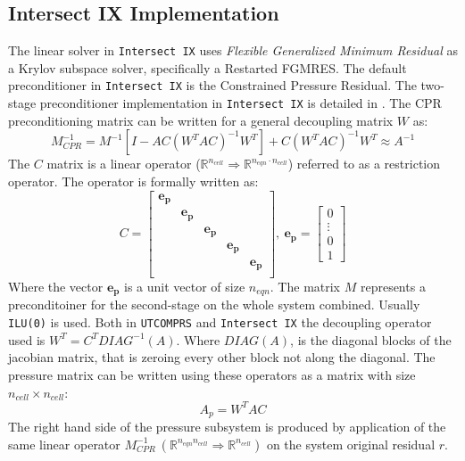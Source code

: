 \subsection{Intersect IX Implementation}
The linear solver in \texttt{Intersect IX} uses \textit{Flexible Generalized Minimum Residual} as a Krylov subspace solver, specifically a Restarted FGMRES.  
The default preconditioner in \texttt{Intersect IX} is the Constrained Pressure Residual. The two-stage preconditioner implementation in \texttt{Intersect IX}
is detailed in \cite{ix-cpr,ix-tech}. The CPR preconditioning matrix can be written for a general decoupling matrix $W$ as:
\begin{equation}
	M_{CPR}^{-1} = M^{-1}[I - AC(W^{T}AC)^{-1}W^{T}] + C(W^{T}AC)^{-1}W^{T}\approx A^{-1}
\end{equation}
The $C$ matrix is a linear operator ($\mathbb{R}^{n_{cell}}\Rightarrow\mathbb{R}^{n_{eqn}\cdot n_{cell}}$) referred to as a restriction operator.
The operator is formally written as:
\begin{equation}
	C = \begin{bmatrix}
		\mathbf{e_{p}} & & & & \\
		      & \mathbf{e_{p}} & & &\\ 
		      &  & \mathbf{e_{p}}& &\\ 
		      &  & & \mathbf{e_{p}}&\\ 
		      &  & & &\mathbf{e_{p}}\\ 
	\end{bmatrix}, \ 
	\mathbf{e_{p}} = \begin{bmatrix}
		0\\
		\vdots\\
		0\\
		1
	\end{bmatrix}
	\label{cop}
\end{equation}
Where the vector $\mathbf{e_{p}}$ is a unit vector of size $n_{eqn}$.
The matrix $M$ represents a preconditoiner for the second-stage on the whole system combined. Usually \texttt{ILU(0)} is used.
Both in \texttt{UTCOMPRS} and \texttt{Intersect IX} the decoupling operator used is $W^{T} = C^{T}DIAG^{-1}(A)$. Where $DIAG(A)$,
is the diagonal blocks of the jacobian matrix, that is zeroing every other block not along the diagonal. The pressure matrix can be written
using these operators as a matrix with size $n_{cell}\times n_{cell}$:
\begin{equation}
	A_{p} = W^{T}AC
\end{equation}
The right hand side of the pressure subsystem is produced by application of the same linear operator $M_{CPR}^{-1} \ (\mathbb{R}^{n_{eqn}n_{cell}}\Rightarrow\mathbb{R}^{n_{cell}})$ 
on the system original residual $r$.

